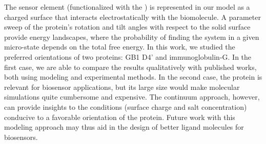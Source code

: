 The sensor element (functionalized with the \sam) is represented in our model as a charged surface that interacts electrostatically with the biomolecule. A parameter sweep of the protein's rotation and tilt angles with respect to the solid surface provide energy landscapes, where the probability of finding the system in a given micro-state depends on the total free energy.
In this work, we studied the preferred orientations of two proteins: GB1 D4' and immunoglobulin-G. In the first case, we are able to compare the results qualitatively with published works, both using modeling and experimental methods. In the second case, the protein is relevant for biosensor applications, but its large size would make molecular simulations quite cumbersome and expensive. The continuum approach, however, can provide insights to the conditions (surface charge and salt concentration) conducive to a favorable orientation of the protein. 
Future work with this modeling approach may thus aid in the design of better ligand molecules for biosensors.

